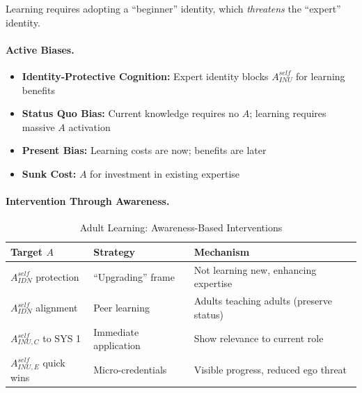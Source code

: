 Learning requires adopting a ``beginner'' identity, which \emph{threatens} 
the ``expert'' identity.

\paragraph{Active Biases.}
\begin{itemize}
\item \textbf{Identity-Protective Cognition:} Expert identity blocks 
$A^{self}_{INU}$ for learning benefits
\item \textbf{Status Quo Bias:} Current knowledge requires no $A$; 
learning requires massive $A$ activation
\item \textbf{Present Bias:} Learning costs are now; benefits are later
\item \textbf{Sunk Cost:} $A$ for investment in existing expertise
\end{itemize}

\paragraph{Intervention Through Awareness.}

\begin{table}[htbp]
\centering
\caption{Adult Learning: Awareness-Based Interventions}
\label{tab:education-intervention}
\renewcommand{\arraystretch}{1.3}
\begin{tabular}{@{}lll@{}}
\toprule
\textbf{Target $A$} & \textbf{Strategy} & \textbf{Mechanism} \\
\midrule
$A^{self}_{IDN}$ protection & ``Upgrading'' frame & Not learning new, enhancing expertise \\
$A^{self}_{IDN}$ alignment & Peer learning & Adults teaching adults (preserve status) \\
$A^{self}_{INU,C}$ to SYS 1 & Immediate application & Show relevance to current role \\
$A^{self}_{INU,E}$ quick wins & Micro-credentials & Visible progress, reduced ego threat \\
\bottomrule
\end{tabular}
\end{table}

